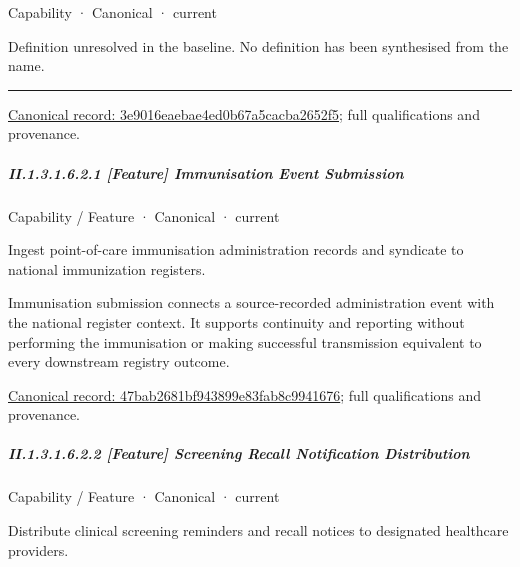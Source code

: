 \label{element:3e9016eaebae4ed0b67a5cacba2652f5}
{\small Capability · Canonical · current}\par

Definition unresolved in the baseline. No definition has been synthesised from the name.



\medskip\hrule\medskip

{\footnotesize \href{../../../../continuum/strategy/capability/3e9016eaebae4ed0b67a5cacba2652f5.md}{Canonical record: 3e9016eaebae4ed0b67a5cacba2652f5}; full qualifications and provenance.}\par
\subparagraph*{II.1.3.1.6.2.1 [Feature] Immunisation Event Submission}
\label{navigation:II.1.3.1.6.2.1}

\label{element:47bab2681bf943899e83fab8c9941676}
{\small Capability / Feature · Canonical · current}\par

Ingest point-of-care immunisation administration records and syndicate to national immunization registers.



Immunisation submission connects a source-recorded administration event with the national register context. It supports continuity and reporting without performing the immunisation or making successful transmission equivalent to every downstream registry outcome.


{\footnotesize \href{../../../../continuum/strategy/capability/feature/47bab2681bf943899e83fab8c9941676.md}{Canonical record: 47bab2681bf943899e83fab8c9941676}; full qualifications and provenance.}\par
\subparagraph*{II.1.3.1.6.2.2 [Feature] Screening Recall Notification Distribution}
\label{navigation:II.1.3.1.6.2.2}

\label{element:7ec85487625349a7b3292585fadb20c7}
{\small Capability / Feature · Canonical · current}\par

Distribute clinical screening reminders and recall notices to designated healthcare providers.



